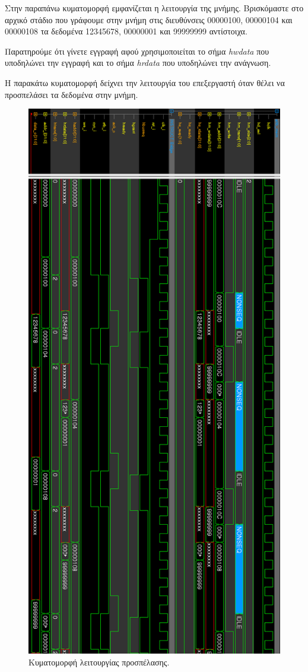 \documentclass[a4paper,10pt]{article}
\numberwithin{figure}{section}
\numberwithin{table}{section}
\begin{document}
\newpage
Στην παραπάνω κυματομορφή εμφανίζεται η λειτουργία της μνήμης. Βρισκόμαστε στο αρχικό στάδιο που γράφουμε στην μνήμη στις διευθύνσεις 00000100, 00000104 και 00000108 τα δεδομένα 12345678, 00000001 και 99999999 αντίστοιχα.

Παρατηρούμε ότι γίνετε εγγραφή αφού χρησιμοποιείται το σήμα \emph{hwdata} που υποδηλώνει την εγγραφή και το σήμα \emph{hrdata} που υποδηλώνει την ανάγνωση.
\newline

Η παρακάτω κυματομορφή δείχνει την λειτουργία του επεξεργαστή όταν θέλει να προσπελάσει τα δεδομένα στην μνήμη.
\newpage
\begin{figure}[h!]
 \centering
 \includegraphics[bb=0 0 665 1437,scale=0.38]{./Images/waves_I_BR_FINAL.png}
 \caption{Κυματομορφή λειτουργίας προσπέλασης.}
\end{figure}
\end{document}
